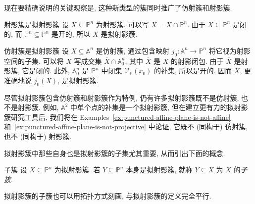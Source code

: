 现在要精确说明的关键观察是, 这种新类型的簇同时推广了仿射簇和射影簇.

\begin{Example}{射影簇是拟射影簇}\leavevmode\label{ex:projective-varieties-are-quasiprojective}
设 $X\subseteq\mathbb{P}^{n}$ 为射影簇. 可以写 $X=X\cap\mathbb{P}^{n}$. 由于 $X\subseteq\mathbb{P}^{n}$ 是闭的, 而 $\mathbb{P}^{n}\subseteq\mathbb{P}^{n}$ 是开的, 所以 $X$ 是拟射影簇.
\end{Example}

\begin{Example}{仿射簇是拟射影簇}\leavevmode\label{ex:affine-varieties-are-quasiprojective}
设 $X\subseteq\mathbb{A}^{n}$ 是仿射簇, 通过包含映射 $j_{0}:\mathbb{A}^{n}\to\mathbb{P}^{n}$ 将它视为射影空间的子集. 可以将 $X$ 写成交集 $\overline{X}\cap\mathbb{A}^{n}_{0}$, 其中 $\overline{X}$ 是 $X$ 的射影闭包. 由于 $\overline{X}$ 是射影簇, 它是闭的. 此外, $\mathbb{A}^{n}_{0}$ 是 $\mathbb{P}^{n}$ 中闭集 $\mathcal{V}_{\mathbb{P}}(x_{0})$ 的补集, 所以是开的. 因而 $X$, 更准确地说 $j_{0}(X)$, 是拟射影簇.
\end{Example}

尽管拟射影簇包含仿射簇和射影簇作为特例, 仍有许多拟射影簇既不是仿射簇, 也不是射影簇. 例如, $\mathbb{A}^{2}$ 中单个点的补集是一个拟射影簇, 但在建立更有力的拟射影簇研究工具后, 我们将在 Examples~\ref{ex:punctured-affine-plane-is-not-affine} 和~\ref{ex:punctured-affine-plane-is-not-projective} 中论证, 它既不 (同构于) 仿射簇, 也不 (同构于) 射影簇.

拟射影簇中那些自身也是拟射影簇的子集尤其重要, 从而引出下面的概念.

\begin{Definition}{子簇}\leavevmode\label{def:subvariety-of-quasiprojective-variety}
设 $X\subseteq\mathbb{P}^{n}$ 为拟射影簇. 若 $Y\subseteq\mathbb{P}^{n}$ 本身是拟射影簇, 就称 $Y\subseteq X$ 为 $X$ 的\emph{子簇}.
\end{Definition}

拟射影簇的子簇也可以用拓扑方式刻画, 与拟射影簇的定义完全平行.

